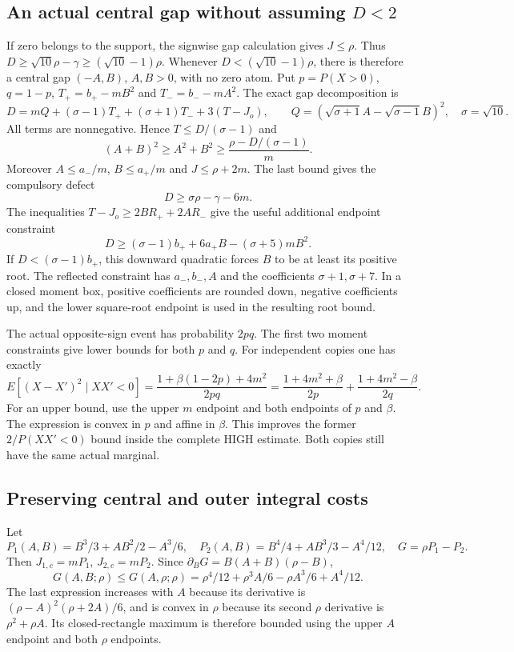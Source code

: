 \documentclass[11pt,a4paper]{article}
\numberwithin{equation}{section}
\theoremstyle{definition}
\theoremstyle{remark}
\begin{document}
\subsection{An actual central gap without assuming $D<2$}
If zero belongs to the support, the signwise gap calculation gives $J\le\rho$.
Thus $D\ge\sqrt{10}\rho-\gamma\ge(\sqrt{10}-1)\rho$.
Whenever $D<(\sqrt{10}-1)\rho$, there is therefore a central gap
$(-A,B)$, $A,B>0$, with no zero atom. Put $p=P(X>0)$, $q=1-p$,
$T_+=b_+-mB^2$ and $T_-=b_--mA^2$. The exact gap decomposition is
\[
 D=mQ+(\sigma-1)T_++(\sigma+1)T_-+3(T-J_o),\qquad
 Q=(\sqrt{\sigma+1}A-\sqrt{\sigma-1}B)^2,
 \quad\sigma=\sqrt{10}.
\]
All terms are nonnegative. Hence $T\le D/(\sigma-1)$ and
\[
 (A+B)^2\ge A^2+B^2\ge\frac{\rho-D/(\sigma-1)}m.
\]
Moreover $A\le a_-/m$, $B\le a_+/m$ and $J\le\rho+2m$.
The last bound gives the compulsory defect
\[
 D\ge \sigma\rho-\gamma-6m.
\]
The inequalities $T-J_o\ge2BR_++2AR_-$ give the useful additional
endpoint constraint
\[
 D\ge(\sigma-1)b_++6a_+B-(\sigma+5)mB^2.
\]
If $D<(\sigma-1)b_+$, this downward quadratic forces $B$ to be at
least its positive root. The reflected constraint has $a_-,b_-,A$
and the coefficients $\sigma+1,\sigma+7$. In a closed moment box,
positive coefficients are rounded down, negative coefficients up, and
the lower square-root endpoint is used in the resulting root bound.

The actual opposite-sign event has probability $2pq$.
The first two moment constraints give lower bounds for both $p$ and $q$.
For independent copies one has exactly
\[
 E[(X-X')^2\mid XX'<0]
 =\frac{1+\beta(1-2p)+4m^2}{2pq}
 =\frac{1+4m^2+\beta}{2p}
  +\frac{1+4m^2-\beta}{2q}.
\]
For an upper bound, use the upper $m$ endpoint and both endpoints of
$p$ and $\beta$. The expression is convex in $p$ and affine in $\beta$.
This improves the former $2/P(XX'<0)$ bound inside the complete HIGH
estimate. Both copies still have the same actual marginal.

\subsection{Preserving central and outer integral costs}
Let
\[
 P_1(A,B)=B^3/3+AB^2/2-A^3/6,\quad
 P_2(A,B)=B^4/4+AB^3/3-A^4/12,\quad G=\rho P_1-P_2.
\]
Then $J_{1,c}=mP_1$, $J_{2,c}=mP_2$. Since
$\partial_BG=B(A+B)(\rho-B)$,
\[
 G(A,B;\rho)\le G(A,\rho;\rho)
 =\rho^4/12+\rho^3A/6-\rho A^3/6+A^4/12.
\]
The last expression increases with $A$ because its derivative is
$(\rho-A)^2(\rho+2A)/6$, and is convex in $\rho$ because its second
$\rho$ derivative is $\rho^2+\rho A$. Its closed-rectangle maximum is
therefore bounded using the upper $A$ endpoint and both $\rho$ endpoints.
\end{document}
